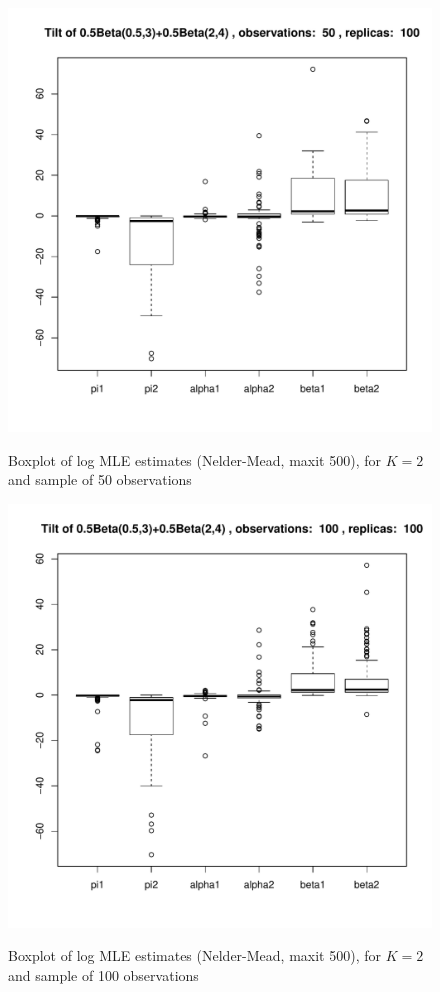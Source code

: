 \documentclass[10pt]{report}
\begin{document}
\begin{figure}[h]
\centering
\includegraphics[width=\textwidth]{../img/p05_a05_b3_p05_a2_b4/tilted/K2/bxplots/n50_R100.pdf}
\label{fig:TBD2}
\caption{Boxplot of log MLE estimates (Nelder-Mead, maxit 500), for $K=2$ and sample of 50 observations}
\end{figure}

\begin{figure}[h]
\centering
\includegraphics[width=\textwidth]{../img/p05_a05_b3_p05_a2_b4/tilted/K2/bxplots/n100_R100.pdf}
\label{fig:TBD3}
\caption{Boxplot of log MLE estimates (Nelder-Mead, maxit 500), for $K=2$ and sample of 100 observations}
\end{figure}
\end{document}
